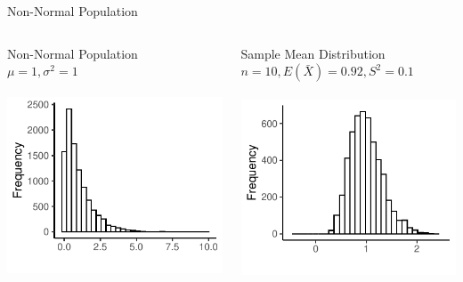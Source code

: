\documentclass{./../div_teaching_slides}
\begin{document}
\begin{frame}{Non-Normal Population}
\centering
\begin{columns}
\begin{column}{0.475\textwidth}
\centering
Non-Normal Population \\ $\mu=1, \sigma^2 = 1$ \\~\\
\includegraphics{./../../output/clt_exp_pop.pdf}
\end{column}
\begin{column}{0.475\textwidth}
\centering
Sample Mean Distribution \\ $n=10, E(\bar{X})=0.92, S^2 = 0.1$ \\~\\
\includegraphics{./../../output/clt_exp_samp_n10.pdf}
\end{column}
\end{columns}
\end{frame}
\end{document}
